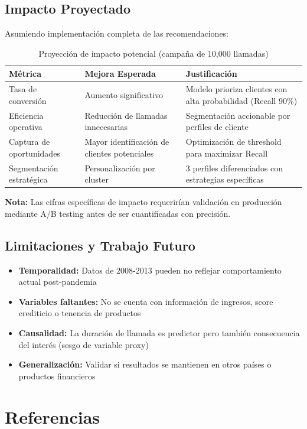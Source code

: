 \documentclass[12pt,letterpaper]{article}
\begin{document}
\subsection{Impacto Proyectado}

Asumiendo implementación completa de las recomendaciones:

\begin{table}[H]
\centering
\caption{Proyección de impacto potencial (campaña de 10,000 llamadas)}
\label{tab:impacto_proyectado}
\begin{tabular}{@{}lp{4cm}p{6cm}@{}}
\toprule
\textbf{Métrica} & \textbf{Mejora Esperada} & \textbf{Justificación} \\
\midrule
Tasa de conversión & Aumento significativo & Modelo prioriza clientes con alta probabilidad (Recall 90\%) \\
\addlinespace
Eficiencia operativa & Reducción de llamadas innecesarias & Segmentación accionable por perfiles de cliente \\
\addlinespace
Captura de oportunidades & Mayor identificación de clientes potenciales & Optimización de threshold para maximizar Recall \\
\addlinespace
Segmentación estratégica & Personalización por cluster & 3 perfiles diferenciados con estrategias específicas \\
\bottomrule
\end{tabular}
\end{table}

\textbf{Nota:} Las cifras específicas de impacto requerirían validación en producción mediante A/B testing antes de ser cuantificadas con precisión.

\subsection{Limitaciones y Trabajo Futuro}

\begin{itemize}
    \item \textbf{Temporalidad:} Datos de 2008-2013 pueden no reflejar comportamiento actual post-pandemia
    \item \textbf{Variables faltantes:} No se cuenta con información de ingresos, score crediticio o tenencia de productos
    \item \textbf{Causalidad:} La duración de llamada es predictor pero también consecuencia del interés (sesgo de variable proxy)
    \item \textbf{Generalización:} Validar si resultados se mantienen en otros países o productos financieros
\end{itemize}

\newpage
\section{Referencias}



\end{document}
